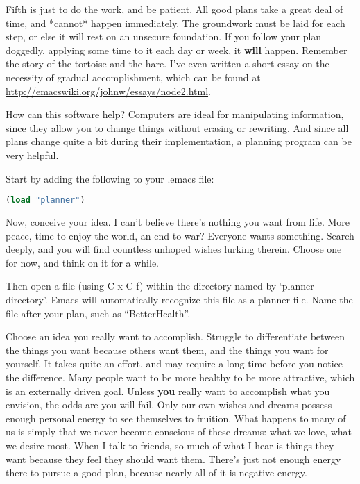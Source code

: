\documentclass[12pt,a4paper,onecolumn]{article}
\begin{document}
\begin{sffamily}
Fifth is just to do the work, and be patient. All good plans take a great deal of time, and *cannot*
happen immediately. The groundwork must be laid for each step, or else it will rest on an unsecure
foundation. If you follow your plan doggedly, applying some time to it each day or week, it
\textbf{will} happen. Remember the story of the tortoise and the hare. I've even written a short
essay on the necessity of gradual accomplishment, which can be found at
\url{http://emacswiki.org/johnw/essays/node2.html}.

How can this software help? Computers are ideal for manipulating information, since they allow you
to change things without erasing or rewriting. And since all plans change quite a bit during their
implementation, a planning program can be very helpful.

Start by adding the following to your .emacs file:

\begin{lstlisting}[language=Lisp] (load "planner")
\end{lstlisting}


Now, conceive your idea. I can't believe there's nothing you want from life. More peace, time to
enjoy the world, an end to war? Everyone wants something. Search deeply, and you will find countless
unhoped wishes lurking therein. Choose one for now, and think on it for a while.

Then open a file (using C-x C-f) within the directory named by `planner-directory'. Emacs will
automatically recognize this file as a planner file. Name the file after your plan, such as
``BetterHealth''.

Choose an idea you really want to accomplish. Struggle to differentiate between the things you want
because others want them, and the things you want for yourself. It takes quite an effort, and may
require a long time before you notice the difference. Many people want to be more healthy to be more
attractive, which is an externally driven goal. Unless \textbf{you} really want to accomplish what
you envision, the odds are you will fail. Only our own wishes and dreams possess enough personal
energy to see themselves to fruition. What happens to many of us is simply that we never become
conscious of these dreams: what we love, what we desire most. When I talk to friends, so much of
what I hear is things they want because they feel they should want them. There's just not enough
energy there to pursue a good plan, because nearly all of it is negative energy.


\end{sffamily}
\end{document}
